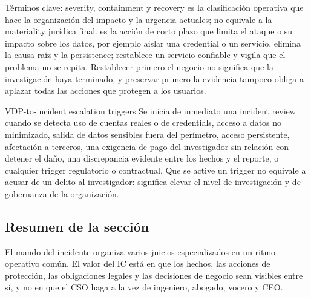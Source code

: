 \begin{knowledgebox}{Términos clave: severity, containment y recovery}
 es la clasificación operativa que hace la organización del impacto y la urgencia actuales; no equivale a la materiality jurídica final.  es la acción de corto plazo que limita el ataque o su impacto sobre los datos, por ejemplo aislar una credential o un servicio.  elimina la causa raíz y la persistence;  restablece un servicio confiable y vigila que el problema no se repita. Restablecer primero el negocio no significa que la investigación haya terminado, y preservar primero la evidencia tampoco obliga a aplazar todas las acciones que protegen a los usuarios.
\end{knowledgebox}


\begin{importantbox}{VDP-to-incident escalation triggers}
Se inicia de inmediato una incident review cuando se detecta uso de cuentas reales o de credentials, acceso a datos no minimizado, salida de datos sensibles fuera del perímetro, acceso persistente, afectación a terceros, una exigencia de pago del investigador sin relación con detener el daño, una discrepancia evidente entre los hechos y el reporte, o cualquier trigger regulatorio o contractual. Que se active un trigger no equivale a acusar de un delito al investigador: significa elevar el nivel de investigación y de gobernanza de la organización.
\end{importantbox}

\subsection{Resumen de la sección}

El mando del incidente organiza varios juicios especializados en un ritmo operativo común. El valor del IC está en que los hechos, las acciones de protección, las obligaciones legales y las decisiones de negocio sean visibles entre sí, y no en que el CSO haga a la vez de ingeniero, abogado, vocero y CEO.
